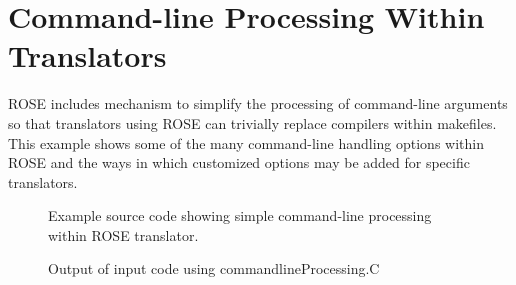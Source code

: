 \chapter{Command-line Processing Within Translators}

     ROSE includes mechanism to simplify the processing of command-line arguments
so that translators using ROSE can trivially replace compilers within
makefiles.  This example shows some of the many command-line handling
options within ROSE and the ways in which customized options may be added for 
specific translators.


\begin{figure}[!h]
{\indent
{\mySmallFontSize

\label{Tutorial:exampleCommandlineProcessing}

\begin{latexonly}
   
\end{latexonly}

\begin{htmlonly}
   
\end{htmlonly}

}
}
\caption{Example source code showing simple command-line processing within ROSE translator.}
\end{figure}


\begin{figure}[!h]
{\indent
{\mySmallFontSize

\label{Tutorial:exampleOutput_CommandlineProcessing}

\begin{latexonly}
   
\end{latexonly}

\begin{htmlonly}
   
\end{htmlonly}

}
}
\caption{Output of input code using commandlineProcessing.C}
\end{figure}


